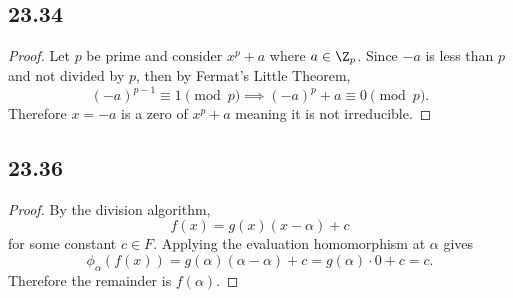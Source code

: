 \documentclass[12pt,titlepage]{extarticle}
\begin{document}
\subsection*{23.34}
\begin{proof}
    Let $p$ be prime and consider $x^p + a$ where $a \in \Z_p$. Since $-a$ is less than $p$ and not divided by $p$, then by Fermat's Little Theorem,
    \[
        (-a)^{p-1} \equiv 1 \pmod{p} \implies (-a)^{p} + a \equiv 0 \pmod{p}
    .\]
    Therefore $x = -a$ is a zero of $x^p + a$ meaning it is not irreducible.
\end{proof}

\subsection*{23.36}
\begin{proof}
    By the division algorithm,
    \[
        f(x) = g(x)(x-\alpha) + c
    \]
    for some constant $c \in F$. Applying the evaluation homomorphism at $\alpha$ gives
    \[
        \phi_{\alpha}(f(x)) = g(\alpha)(\alpha - \alpha) + c = g(\alpha) \cdot 0 + c = c
    .\]
    Therefore the remainder is $f(\alpha)$.
\end{proof}
\end{document}
